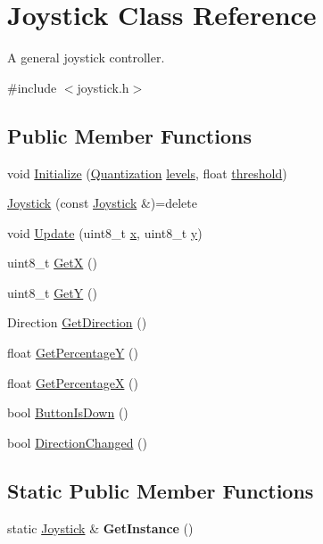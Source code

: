 \hypertarget{class_joystick}{}\section{Joystick Class Reference}
\label{class_joystick}


A general joystick controller.  




{\ttfamily \#include $<$joystick.\+h$>$}

\subsection*{Public Member Functions}
\begin{DoxyCompactItemize}
\item 
void \hyperlink{class_joystick_a81ab2867d039ed9c974ee56c10063d8e}{Initialize} (\hyperlink{struct_quantization}{Quantization} \hyperlink{class_joystick_ae60f2daf5c456900e821b2fde565ef38}{levels}, float \hyperlink{class_joystick_a30b68bce5589674148d43b4854b25cef}{threshold})
\item 
\hyperlink{class_joystick_a93a3cb5bc4d4ea7c94709b8730257f13}{Joystick} (const \hyperlink{class_joystick}{Joystick} \&)=delete
\item 
void \hyperlink{class_joystick_a07571eca717b70b094f9aa42d90bced7}{Update} (uint8\+\_\+t \hyperlink{class_joystick_abeb4f1563a57266700a48ba5aa49b4cd}{x}, uint8\+\_\+t \hyperlink{class_joystick_a691b70ed215adf414e0ab4edba5407a2}{y})
\item 
uint8\+\_\+t \hyperlink{class_joystick_ae578e9c06313f37a53c3b0c4e0ca014d}{GetX} ()
\item 
uint8\+\_\+t \hyperlink{class_joystick_a849ffb99289dcb3186e532fd1115cf46}{GetY} ()
\item 
Direction \hyperlink{class_joystick_a8a8ad3f735c9e3e3a0bbd9ac0e73f4cc}{Get\+Direction} ()
\item 
float \hyperlink{class_joystick_af774eede094927838113b9ff3a8252bb}{Get\+PercentageY} ()
\item 
float \hyperlink{class_joystick_a661653de4d298a9dccf316b1768206ea}{Get\+PercentageX} ()
\item 
bool \hyperlink{class_joystick_a35c4969f04f76a83860d9adf6ca3adba}{Button\+Is\+Down} ()
\item 
bool \hyperlink{class_joystick_ac905c75bcfe0701d3f2005d0c424cef3}{Direction\+Changed} ()
\end{DoxyCompactItemize}
\subsection*{Static Public Member Functions}
\begin{DoxyCompactItemize}
\item 
\hypertarget{class_joystick_a960c53cb9f02733747314f00b2e23b24}{}\label{class_joystick_a960c53cb9f02733747314f00b2e23b24} 
static \hyperlink{class_joystick}{Joystick} \& {\bfseries Get\+Instance} ()
\end{DoxyCompactItemize}
